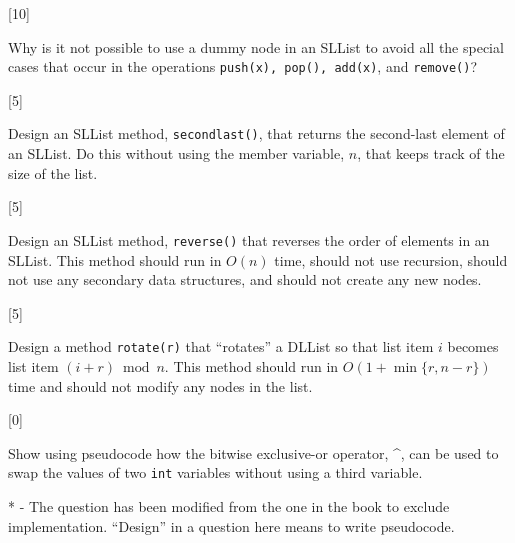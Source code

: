 \documentclass[addpoints]{exam}
\begin{document}
\begin{questions}
[10]

Why is it not possible to use a dummy node in an SLList to avoid all the special cases that occur in the operations {\tt push(x), pop(), add(x)}, and {\tt remove()}?
\begin{solution}
\end{solution}

[5]

Design an SLList method, {\tt second\textunderscore last()}, that returns the second-last element of an SLList. Do this without using the member variable, $n$, that keeps track of the size of the list.
\begin{solution}
\end{solution}

[5]

Design an SLList method, {\tt reverse()} that reverses the order of elements in an SLList. This method should run in $O(n)$ time, should not use recursion, should not use any secondary data structures, and should not create any new nodes.
\begin{solution}
\end{solution}

[5]

Design a method {\tt rotate(r)} that ``rotates'' a DLList so that list item $i$ becomes list item $(i + r) \bmod n$. This method should run in $O(1 + \min\{r, n-r\})$ time and should not modify any nodes in the list.
\begin{solution}
\end{solution}

[0]

Show using pseudocode how the bitwise exclusive-or operator, \^{}, can be used to swap the values of two {\tt int} variables without using a third variable.
\begin{solution}
\end{solution}

* - The question has been modified from the one in the book to exclude implementation. ``Design'' in a question here means to write pseudocode.
\end{questions}
\end{document}
